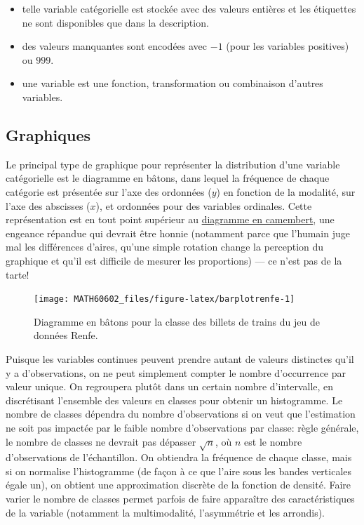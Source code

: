 \documentclass[
  11pt,
  letterpaper,
]{book}
\providecommand{\tightlist}{%
  \setlength{\itemsep}{0pt}\setlength{\parskip}{0pt}}
\theoremstyle{definition}
\theoremstyle{definition}
\theoremstyle{definition}
\theoremstyle{remark}
\begin{document}
\begin{itemize}
\tightlist
\item
  telle variable catégorielle est stockée avec des valeurs entières et les étiquettes ne sont disponibles que dans la description.
\item
  des valeurs manquantes sont encodées avec \(-1\) (pour les variables positives) ou \(999\).
\item
  une variable est une fonction, transformation ou combinaison d'autres variables.
\end{itemize}

\hypertarget{graphiques}{%
\subsection{Graphiques}\label{graphiques}}

Le principal type de graphique pour représenter la distribution d'une variable catégorielle est le diagramme en bâtons, dans lequel la fréquence de chaque catégorie est présentée sur l'axe des ordonnées (\(y\)) en fonction de la modalité, sur l'axe des abscisses (\(x\)), et ordonnées pour des variables ordinales. Cette représentation est en tout point supérieur au \href{http://www.perceptualedge.com/articles/08-21-07.pdf}{diagramme en camembert}, une engeance répandue qui devrait être honnie (notamment parce que l'humain juge mal les différences d'aires, qu'une simple rotation change la perception du graphique et qu'il est difficile de mesurer les proportions) --- ce n'est pas de la tarte!

\begin{figure}

{\centering \texttt{[image: MATH60602\_files/figure-latex/barplotrenfe-1]} 

}

\caption{Diagramme en bâtons pour la classe des billets de trains du jeu de données Renfe.}\label{fig:barplotrenfe}
\end{figure}

Puisque les variables continues peuvent prendre autant de valeurs distinctes qu'il y a d'observations, on ne peut simplement compter le nombre d'occurrence par valeur unique. On regroupera plutôt dans un certain nombre d'intervalle, en discrétisant l'ensemble des valeurs en classes pour obtenir un histogramme. Le nombre de classes dépendra du nombre d'observations si on veut que l'estimation ne soit pas impactée par le faible nombre d'observations par classe: règle générale, le nombre de classes ne devrait pas dépasser \(\sqrt{n}\), où \(n\) est le nombre d'observations de l'échantillon. On obtiendra la fréquence de chaque classe, mais si on normalise l'histogramme (de façon à ce que l'aire sous les bandes verticales égale un), on obtient une approximation discrète de la fonction de densité. Faire varier le nombre de classes permet parfois de faire apparaître des caractéristiques de la variable (notamment la multimodalité, l'asymmétrie et les arrondis).
\end{document}

